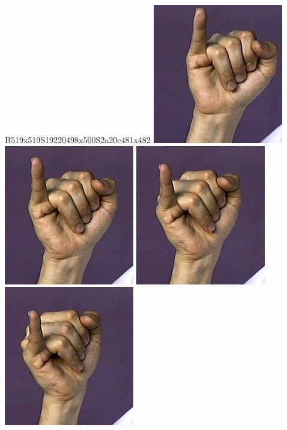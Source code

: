 \documentclass{article}
\begin{document}
B519x519S19220498x500S2a20c481x482
\includegraphics[scale=0.5]{images/j1.jpg}
\includegraphics[scale=0.5]{images/j2.jpg}
\includegraphics[scale=0.5]{images/j3.jpg}
\includegraphics[scale=0.5]{images/j4.jpg}
\end{document}

